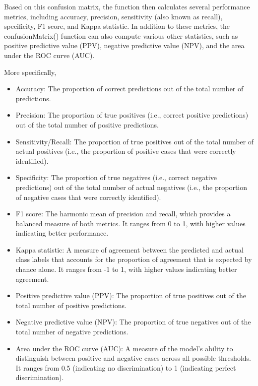 \documentclass[
]{ctexart}
\begin{document}
Based on this confusion matrix, the function then calculates several
performance metrics, including accuracy, precision, sensitivity (also
known as recall), specificity, F1 score, and Kappa statistic. In
addition to these metrics, the confusionMatrix() function can also
compute various other statistics, such as positive predictive value
(PPV), negative predictive value (NPV), and the area under the ROC curve
(AUC).

More specifically,

\begin{itemize}
\item
  Accuracy: The proportion of correct predictions out of the total
  number of predictions.
\item
  Precision: The proportion of true positives (i.e., correct positive
  predictions) out of the total number of positive predictions.
\item
  Sensitivity/Recall: The proportion of true positives out of the total
  number of actual positives (i.e., the proportion of positive cases
  that were correctly identified).
\item
  Specificity: The proportion of true negatives (i.e., correct negative
  predictions) out of the total number of actual negatives (i.e., the
  proportion of negative cases that were correctly identified).
\item
  F1 score: The harmonic mean of precision and recall, which provides a
  balanced measure of both metrics. It ranges from 0 to 1, with higher
  values indicating better performance.
\item
  Kappa statistic: A measure of agreement between the predicted and
  actual class labels that accounts for the proportion of agreement that
  is expected by chance alone. It ranges from -1 to 1, with higher
  values indicating better agreement.
\item
  Positive predictive value (PPV): The proportion of true positives out
  of the total number of positive predictions.
\item
  Negative predictive value (NPV): The proportion of true negatives out
  of the total number of negative predictions.
\item
  Area under the ROC curve (AUC): A measure of the model's ability to
  distinguish between positive and negative cases across all possible
  thresholds. It ranges from 0.5 (indicating no discrimination) to 1
  (indicating perfect discrimination).
\end{itemize}
\end{document}

